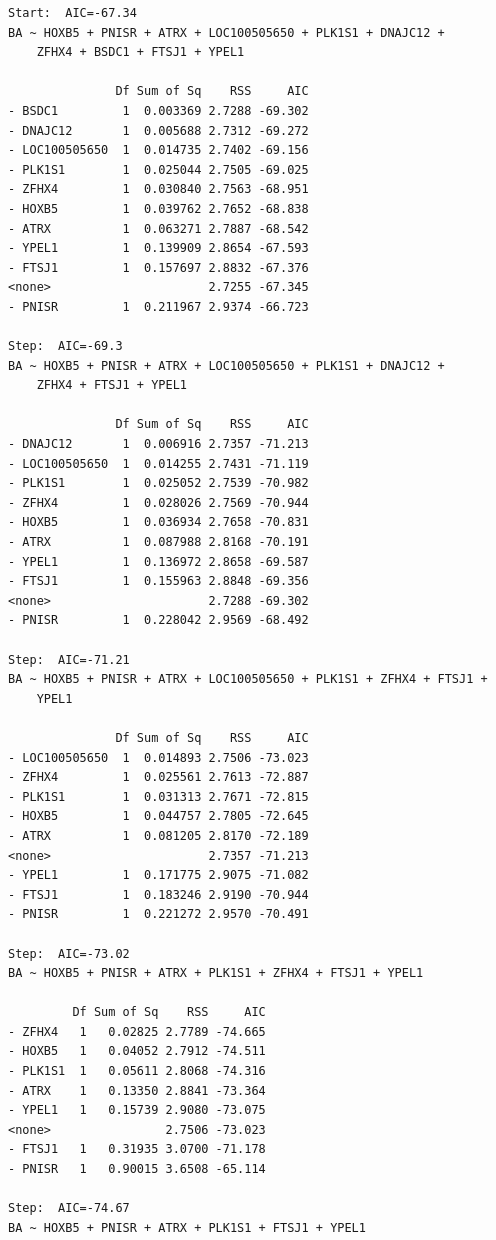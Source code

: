 \documentclass[
  dutch,
  letterpaper,
  12pt]{book}
\newcounter{none} %
\theoremstyle{definition}
\theoremstyle{definition}
\theoremstyle{definition}
\theoremstyle{remark}
\begin{document}
\begin{verbatim}
Start:  AIC=-67.34
BA ~ HOXB5 + PNISR + ATRX + LOC100505650 + PLK1S1 + DNAJC12 + 
    ZFHX4 + BSDC1 + FTSJ1 + YPEL1

               Df Sum of Sq    RSS     AIC
- BSDC1         1  0.003369 2.7288 -69.302
- DNAJC12       1  0.005688 2.7312 -69.272
- LOC100505650  1  0.014735 2.7402 -69.156
- PLK1S1        1  0.025044 2.7505 -69.025
- ZFHX4         1  0.030840 2.7563 -68.951
- HOXB5         1  0.039762 2.7652 -68.838
- ATRX          1  0.063271 2.7887 -68.542
- YPEL1         1  0.139909 2.8654 -67.593
- FTSJ1         1  0.157697 2.8832 -67.376
<none>                      2.7255 -67.345
- PNISR         1  0.211967 2.9374 -66.723

Step:  AIC=-69.3
BA ~ HOXB5 + PNISR + ATRX + LOC100505650 + PLK1S1 + DNAJC12 + 
    ZFHX4 + FTSJ1 + YPEL1

               Df Sum of Sq    RSS     AIC
- DNAJC12       1  0.006916 2.7357 -71.213
- LOC100505650  1  0.014255 2.7431 -71.119
- PLK1S1        1  0.025052 2.7539 -70.982
- ZFHX4         1  0.028026 2.7569 -70.944
- HOXB5         1  0.036934 2.7658 -70.831
- ATRX          1  0.087988 2.8168 -70.191
- YPEL1         1  0.136972 2.8658 -69.587
- FTSJ1         1  0.155963 2.8848 -69.356
<none>                      2.7288 -69.302
- PNISR         1  0.228042 2.9569 -68.492

Step:  AIC=-71.21
BA ~ HOXB5 + PNISR + ATRX + LOC100505650 + PLK1S1 + ZFHX4 + FTSJ1 + 
    YPEL1

               Df Sum of Sq    RSS     AIC
- LOC100505650  1  0.014893 2.7506 -73.023
- ZFHX4         1  0.025561 2.7613 -72.887
- PLK1S1        1  0.031313 2.7671 -72.815
- HOXB5         1  0.044757 2.7805 -72.645
- ATRX          1  0.081205 2.8170 -72.189
<none>                      2.7357 -71.213
- YPEL1         1  0.171775 2.9075 -71.082
- FTSJ1         1  0.183246 2.9190 -70.944
- PNISR         1  0.221272 2.9570 -70.491

Step:  AIC=-73.02
BA ~ HOXB5 + PNISR + ATRX + PLK1S1 + ZFHX4 + FTSJ1 + YPEL1

         Df Sum of Sq    RSS     AIC
- ZFHX4   1   0.02825 2.7789 -74.665
- HOXB5   1   0.04052 2.7912 -74.511
- PLK1S1  1   0.05611 2.8068 -74.316
- ATRX    1   0.13350 2.8841 -73.364
- YPEL1   1   0.15739 2.9080 -73.075
<none>                2.7506 -73.023
- FTSJ1   1   0.31935 3.0700 -71.178
- PNISR   1   0.90015 3.6508 -65.114

Step:  AIC=-74.67
BA ~ HOXB5 + PNISR + ATRX + PLK1S1 + FTSJ1 + YPEL1


\end{verbatim}
\end{document}
